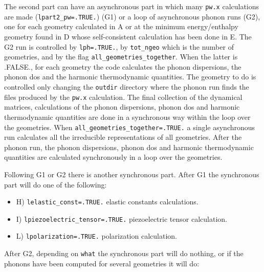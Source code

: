\documentclass[12pt,a4paper]{article}
\begin{document}
The second part can have an asynchronous part in which
many \texttt{pw.x} calculations are made (\texttt{lpart2\_pw=.TRUE.}) (G1)
or a loop of asynchronous phonon runs (G2), one for each geometry calculated
in A or at the minimum energy/enthalpy geometry
found in D whose self-consistent calculation has been done in E.
The G2 run is controlled by \texttt{lph=.TRUE.}, by \texttt{tot\_ngeo} which 
is the number of geometries, and by the flag 
\texttt{all\_geometries\_together}. When the latter is .FALSE.,
for each geometry the code calculates the phonon dispersions, the phonon 
dos and the 
harmonic thermodynamic quantities. The geometry to do is controlled only 
changing the \texttt{outdir} directory where the phonon run finds the
files produced by the \texttt{pw.x} calculation. The final collection
of the dynamical matrices, calculations of the phonon dispersions, phonon 
dos and harmonic thermodynamic quantities are done in a synchronous way 
within the loop over the geometries.
When \texttt{all\_geometries\_together=.TRUE.} a single asynchronous run
calculates all the irreducible representations of all geometries. After
the phonon run, the phonon dispersions, phonon dos and harmonic 
thermodynamic quantities are calculated synchronously in a loop over 
the geometries.

Following G1 or G2 there is another synchronous part. 
After G1 the synchronous part will do one of the following:

\begin{itemize}

\item
H) \texttt{lelastic\_const=.TRUE.} elastic constants calculations.

\item
I) \texttt{lpiezoelectric\_tensor=.TRUE.} piezoelectric tensor calculation.

\item
L) \texttt{lpolarization=.TRUE.} polarization calculation.

\end{itemize}

After G2, depending on \texttt{what} the synchronous part will do nothing, 
or if the phonons have been computed for several geometries it will do:
\end{document}
